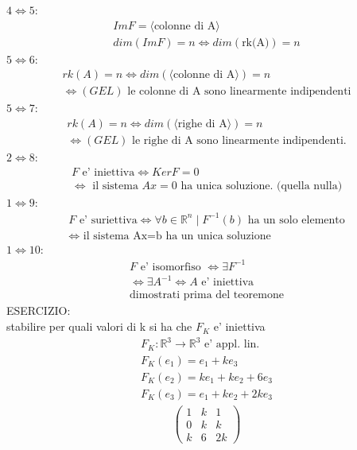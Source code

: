 \documentclass[a4paper,12pt]{article}
\begin{document}
$4 \iff 5$:
\begin{align*}
    Im F = \langle \text{colonne di A}\rangle \\
    dim(Im F)=n \iff dim(\text{rk(A)})=n
\end{align*}
$5 \iff 6$:
\begin{align*}
    rk(A)=n \iff dim(\langle \text{colonne di A}\rangle)=n 
    \\ \iff (GEL) \text{  le colonne di A sono linearmente indipendenti}
\end{align*}
$5 \iff 7$:
\begin{align*}
    rk(A)=n \iff dim(\langle \text{righe di A}\rangle) =n
    \\ \iff(GEL) \text{  le righe di A sono linearmente indipendenti}.
\end{align*}
$2 \iff 8$:
\begin{align*}
    F \text{ e' iniettiva} \iff Ker F={0}
    \\ \iff \text{ il sistema }Ax=0 \text{ ha unica soluzione. (quella nulla)}
\end{align*}
$1 \iff 9$:
\begin{align*}
    F \text{ e' suriettiva} \iff \forall b \in \mathbb{R}^n \mid F^{-1}(b) \text{ ha un solo elemento}
    \\ \iff \text{ il sistema Ax=b ha un unica soluzione}
\end{align*}
$1 \iff 10$:
\begin{align*}
    F \text{ e' isomorfiso } \iff \exists F^{-1} \\
    \iff \exists A^{-1} \iff A \text{ e' iniettiva}
    \\ \text{dimostrati prima del teoremone}
\end{align*}
ESERCIZIO:
\\stabilire per quali valori di k si ha che $F_K$ e' iniettiva
\begin{align*}
    F_K : \mathbb{R}^3 \to \mathbb{R}^3 \text{ e' appl. lin.}\\
    F_K(e_1)=e_1+ke_3 \\
    F_K(e_2)=ke_1+ke_2+6e_3 \\
    F_K(e_3)=e_1+ke_2+2ke_3
\end{align*}
\begin{align*}
    \begin{pmatrix}
        1&k&1\\
        0&k&k\\
        k&6&2k
    \end{pmatrix}
\end{align*}
\end{document}
